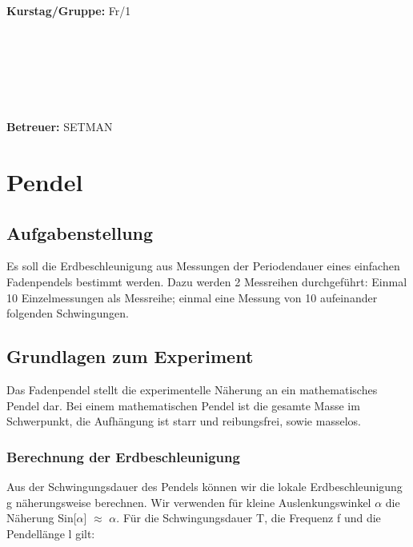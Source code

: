 \documentclass{article}
\begin{document}
\begin{verbatim}


\end{verbatim}
			\begin{flushleft}
			\textbf{\Large{Kurstag/Gruppe:}} \Large{Fr/1}
			\end{flushleft}

\begin{verbatim}






\end{verbatim}
			\begin{flushleft}
			\LARGE{\textbf{Betreuer:}}	\Large{SETMAN}	
			\end{flushleft}
\section{Pendel}	
\subsection{Aufgabenstellung}
Es soll die Erdbeschleunigung aus Messungen der Periodendauer eines einfachen Fadenpendels bestimmt werden. Dazu werden 2 Messreihen durchgeführt: Einmal 10 Einzelmessungen als Messreihe; einmal eine Messung von 10 aufeinander folgenden Schwingungen.
\subsection{Grundlagen zum Experiment}
Das Fadenpendel stellt die experimentelle Näherung an ein mathematisches Pendel dar. Bei einem mathematischen Pendel ist die gesamte Masse im Schwerpunkt, die Aufhängung ist starr und reibungsfrei, sowie masselos.
\subsubsection*{Berechnung der Erdbeschleunigung}
Aus der Schwingungsdauer des Pendels können wir die lokale Erdbeschleunigung g näherungsweise berechnen. Wir verwenden für kleine Auslenkungswinkel $\alpha$ die Näherung Sin[$\alpha$] $\approx$ $\alpha$. 
Für die Schwingungsdauer T, die Frequenz f und die Pendellänge l gilt:
\end{document}
